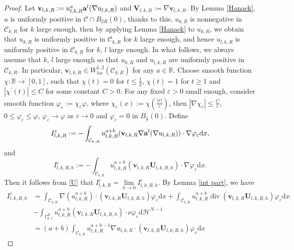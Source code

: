 \documentclass[12pt]{amsart}
\theoremstyle{definition}
\theoremstyle{remark}
\theoremstyle{conclusion}
\theoremstyle{conjecture}
\numberwithin{equation}{section}
\begin{document}
\begin{proof}
Let $\mathbf{v}_{l,k,R}:=u_{l,k,R}^a{\bf{a}}^l(\nabla u_{l,k,R})$ and $\mathbf{V}_{l,k,R}:=\nabla \mathbf{v}_{l,k,R}$. By Lemma \ref{Hanack}, $u$ is uniformly positive in $\mathcal{C}\cap B_{2R}(0)$, thanks to this, $u_{k,R}$ is nonnegative in $\mathcal{C}_{k,R}$ for $k$ large enough, then by applying Lemma \ref{Hanack} to $u_{k,R}$, we obtain that $u_{k,R}$ is uniformly positive in $\mathcal{C}_{k,R}$ for $k$ large enough, and hence $u_{l,k,R}$ is uniformly positive in $\mathcal{C}_{k,R}$ for $k$, $l$ large enough. In what follows, we always assume that $k$, $l$ large enough so that  $u_{k,R}$ and $u_{l,k,R}$ are uniformly positive in $\mathcal{C}_{k,R}$. In particular, $\mathbf{v}_{l,k,R}\in  W^{1,2}_{loc}(\overline{\mathcal{C}_{k,R}})$ for any $a\in\mathbb{R}$. Choose smooth function $\chi:\mathbb{R}\rightarrow [0,1]$, such that $\chi(t)=0$ for $t\leq \frac{1}{2}$, $\chi(t)=1$ for $t\geq 1$ and $|\chi^{\prime}(t)|\leq C$ for some constant $C>0$. For any fixed $\varepsilon>0$ small enough, consider smooth function $\varphi_{\varepsilon}:=\chi_{\varepsilon}\varphi$, where $\chi_{\varepsilon}(x):=\chi(\frac{|x|}{\varepsilon})$, then $|\nabla \chi_{\varepsilon}|\leq\frac{C}{\varepsilon}$, $0\leq \varphi_{\varepsilon}\leq \varphi$, $\varphi_{\varepsilon}\rightarrow \varphi$ as $\varepsilon\rightarrow0$ and $\varphi_{\varepsilon}=0$ in $B_{\frac{\varepsilon}{2}}(0)$. Define
$$I^{\varepsilon}_{l,k,R}:=-\int_{\mathcal{C}_{k,R}}u_{l,k,R}^{a+b}(\mathbf{v}_{l,k,R}\nabla {\bf{a}}^l(\nabla u_{l,k,R}))\cdot\nabla\varphi_{\varepsilon}\mathrm{d}x,$$
and
$$I^{\varepsilon}_{l,k,R,h}:=-\int_{\mathcal{C}_{k,R}}u_{l,k,R}^{a+b}(\mathbf{v}_{l,k,R}\mathbf{U}_{l,k,R,h})\cdot\nabla\varphi_{\varepsilon}\mathrm{d}x.$$
Then it follows from \eqref{U} that $I^{\varepsilon}_{l,k,R}=\lim\limits_{h\rightarrow0}I^{\varepsilon}_{l,k,R,h}$. By Lemma \ref{int part}, we have
\begin{equation*}
  \begin{aligned}
   I^{\varepsilon}_{l,k,R,h}
    &=\int_{\mathcal{C}_{k,R}}\nabla(u_{l,k,R}^{a+b})\cdot (\mathbf{v}_{l,k,R}\mathbf{U}_{l,k,R,h})\varphi_{\varepsilon}\mathrm{d}x
    +\int_{\mathcal{C}_{k,R}}u_{l,k,R}^{a+b}\operatorname{div} (\mathbf{v}_{l,k,R}\mathbf{U}_{l,k,R,h})\varphi_{\varepsilon}\mathrm{d}x\\
    &-\int_{\Gamma_{k,1}^R}u_{l,k,R}^{a+b}(\mathbf{v}_{l,k,R}\mathbf{U}_{l,k,R,h})\cdot\nu\varphi_{\varepsilon}\mathrm{d}\mathcal{H}^{N-1}\\
    &=(a+b)\int_{\mathcal{C}_{k,R}}u_{l,k,R}^{a+b-1}\nabla u_{l,k,R}\cdot (\mathbf{v}_{l,k,R}\mathbf{U}_{l,k,R,h})\varphi_{\varepsilon}\mathrm{d}x

\end{aligned}
\end{equation*}
\end{proof}
\end{document}
